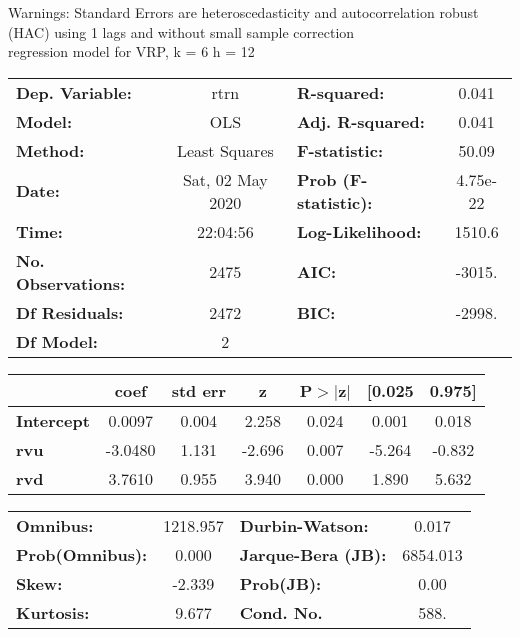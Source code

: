 Warnings: \newline
 [1] Standard Errors are heteroscedasticity and autocorrelation robust (HAC) using 1 lags and without small sample correction\\ 

regression model for VRP, k = 6 h = 12\begin{center}
\begin{tabular}{lclc}
\toprule
\textbf{Dep. Variable:}    &       rtrn       & \textbf{  R-squared:         } &     0.041   \\
\textbf{Model:}            &       OLS        & \textbf{  Adj. R-squared:    } &     0.041   \\
\textbf{Method:}           &  Least Squares   & \textbf{  F-statistic:       } &     50.09   \\
\textbf{Date:}             & Sat, 02 May 2020 & \textbf{  Prob (F-statistic):} &  4.75e-22   \\
\textbf{Time:}             &     22:04:56     & \textbf{  Log-Likelihood:    } &    1510.6   \\
\textbf{No. Observations:} &        2475      & \textbf{  AIC:               } &    -3015.   \\
\textbf{Df Residuals:}     &        2472      & \textbf{  BIC:               } &    -2998.   \\
\textbf{Df Model:}         &           2      & \textbf{                     } &             \\
\bottomrule
\end{tabular}
\begin{tabular}{lcccccc}
                   & \textbf{coef} & \textbf{std err} & \textbf{z} & \textbf{P$> |$z$|$} & \textbf{[0.025} & \textbf{0.975]}  \\
\midrule
\textbf{Intercept} &       0.0097  &        0.004     &     2.258  &         0.024        &        0.001    &        0.018     \\
\textbf{rvu}       &      -3.0480  &        1.131     &    -2.696  &         0.007        &       -5.264    &       -0.832     \\
\textbf{rvd}       &       3.7610  &        0.955     &     3.940  &         0.000        &        1.890    &        5.632     \\
\bottomrule
\end{tabular}
\begin{tabular}{lclc}
\textbf{Omnibus:}       & 1218.957 & \textbf{  Durbin-Watson:     } &    0.017  \\
\textbf{Prob(Omnibus):} &   0.000  & \textbf{  Jarque-Bera (JB):  } & 6854.013  \\
\textbf{Skew:}          &  -2.339  & \textbf{  Prob(JB):          } &     0.00  \\
\textbf{Kurtosis:}      &   9.677  & \textbf{  Cond. No.          } &     588.  \\
\bottomrule
\end{tabular}
\end{center}

